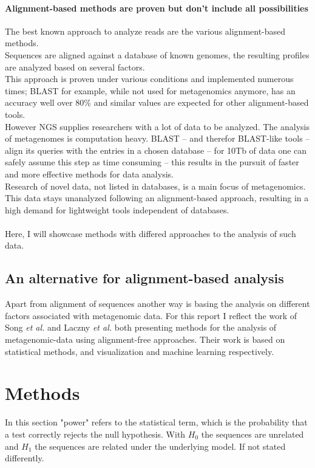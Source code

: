 \documentclass[twocolumn]{bmcart}%
\begin{document}
\paragraph*{Alignment-based methods are proven but don't include all possibilities}
The best known approach to analyze reads are the various alignment-based methods.\\
Sequences are aligned against a database of known genomes, the resulting profiles are analyzed based on several factors.\\
This approach is proven under various conditions and implemented numerous times; BLAST for example, while not used for metagenomics anymore, has an accuracy well over 80\%\cite{doi:10.1142/9789814295291_0003} and similar values are expected for other alignment-based tools.\\
However NGS supplies researchers with a lot of data to be analyzed. The analysis of metagenomes is computation heavy. BLAST -- and therefor BLAST-like tools -- align its queries with the entries in a chosen database -- for 10Tb of data one can safely assume this step as time consuming -- this results in the pursuit of faster and more effective methods for data analysis.\\
Research of  novel data, not listed in databases, is a main focus of metagenomics. This data stays unanalyzed following an alignment-based approach, resulting in a high demand for lightweight tools independent of databases.
\paragraph*{}
Here, I will showcase methods with differed approaches to the analysis of such data. 
\subsection*{An alternative for alignment-based analysis}
Apart from alignment of sequences another way is basing the analysis on different factors associated with metagenomic data. For this report I reflect the work of Song \textit{et al.} \cite{doi:10.1093/bib/bbt067} and Laczny \textit{et al.} \cite{Laczny2014} both presenting methods for the analysis of metagenomic-data using alignment-free approaches. Their work is based on statistical methods, and visualization and machine learning respectively.
\section*{Methods}
In this section "power" refers to the statistical term, which is the probability that a test correctly rejects the null hypothesis. With $H_0$ the sequences are unrelated and $H_1$ the sequences are related under the underlying model. If not stated differently.
\end{document}
